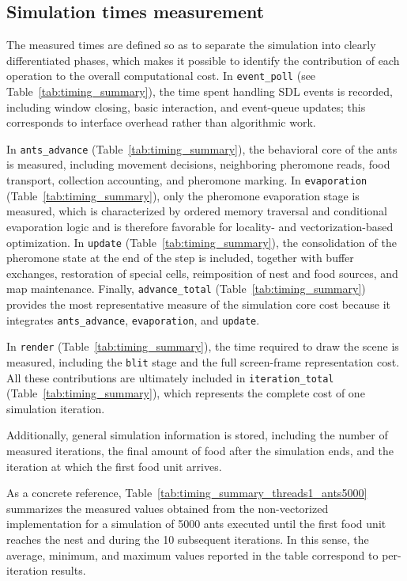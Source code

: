 
\subsection{Simulation times measurement
}
The measured times are defined so as to separate the simulation into clearly differentiated phases, which makes it possible to identify the contribution of each operation to the overall computational cost. In \texttt{event\_poll} (see Table~\ref{tab:timing_summary}), the time spent handling SDL events is recorded, including window closing, basic interaction, and event-queue updates; this corresponds to interface overhead rather than algorithmic work.

In \texttt{ants\_advance} (Table~\ref{tab:timing_summary}), the behavioral core of the ants is measured, including movement decisions, neighboring pheromone reads, food transport, collection accounting, and pheromone marking. In \texttt{evaporation} (Table~\ref{tab:timing_summary}), only the pheromone evaporation stage is measured, which is characterized by ordered memory traversal and conditional evaporation logic and is therefore favorable for locality- and vectorization-based optimization. In \texttt{update} (Table~\ref{tab:timing_summary}), the consolidation of the pheromone state at the end of the step is included, together with buffer exchanges, restoration of special cells, reimposition of nest and food sources, and map maintenance. Finally, \texttt{advance\_total} (Table~\ref{tab:timing_summary}) provides the most representative measure of the simulation core cost because it integrates \texttt{ants\_advance}, \texttt{evaporation}, and \texttt{update}.

In \texttt{render} (Table~\ref{tab:timing_summary}), the time required to draw the scene is measured, including the \texttt{blit} stage and the full screen-frame representation cost. All these contributions are ultimately included in \texttt{iteration\_total} (Table~\ref{tab:timing_summary}), which represents the complete cost of one simulation iteration.

Additionally, general simulation information is stored, including the number of measured iterations, the final amount of food after the simulation ends, and the iteration at which the first food unit arrives.

As a concrete reference, Table~\ref{tab:timing_summary_threads1_ants5000} summarizes the measured values obtained from the non-vectorized implementation for a simulation of 5000 ants executed until the first food unit reaches the nest and during the 10 subsequent iterations. In this sense, the average, minimum, and maximum values reported in the table correspond to per-iteration results.

